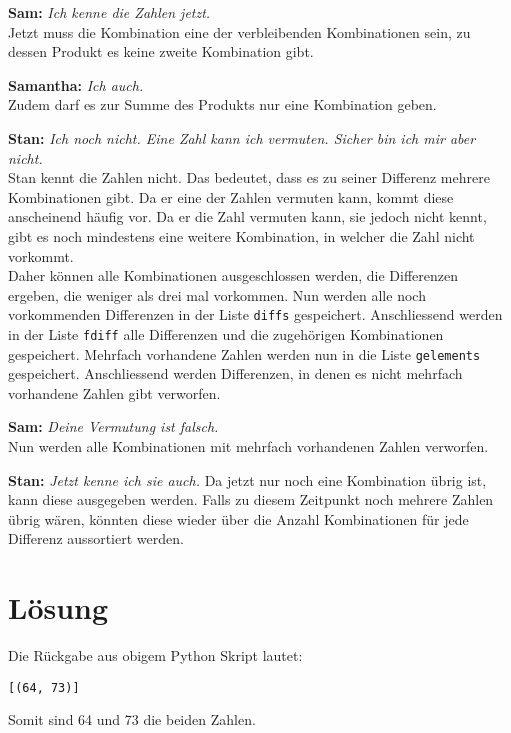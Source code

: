 \documentclass[a4paper, 10pt, fleqn]{article}
\begin{document}
\textbf{Sam: }\emph{Ich kenne die Zahlen jetzt. } \\
Jetzt muss die Kombination eine der verbleibenden Kombinationen sein, zu dessen 
Produkt es keine zweite Kombination gibt. 


\textbf{Samantha: }\emph{Ich auch. } \\
Zudem darf es zur Summe des Produkts nur eine Kombination geben. 


\textbf{Stan: }\emph{Ich noch nicht. Eine Zahl kann ich vermuten. 
Sicher bin ich mir aber nicht.} \\
Stan kennt die Zahlen nicht. Das bedeutet, dass es zu seiner Differenz mehrere 
Kombinationen gibt. Da er eine der Zahlen vermuten kann, kommt diese 
anscheinend häufig vor. Da er die Zahl vermuten kann, sie jedoch nicht kennt, 
gibt es noch mindestens eine weitere Kombination, in welcher die Zahl nicht 
vorkommt. \\
Daher können alle Kombinationen ausgeschlossen werden, die Differenzen ergeben, 
die weniger als drei mal vorkommen. Nun werden alle noch vorkommenden 
Differenzen in der Liste \verb?diffs? gespeichert. Anschliessend werden in der 
Liste \verb?fdiff? alle Differenzen und die zugehörigen Kombinationen 
gespeichert. Mehrfach vorhandene Zahlen werden nun in die Liste 
\verb?gelements? gespeichert. Anschliessend werden Differenzen, in denen es 
nicht mehrfach vorhandene Zahlen gibt verworfen. 


\textbf{Sam: }\emph{Deine Vermutung ist falsch. } \\
Nun werden alle Kombinationen mit mehrfach vorhandenen Zahlen verworfen. 


\textbf{Stan: }\emph{Jetzt kenne ich sie auch. }
Da jetzt nur noch eine Kombination übrig ist, kann diese ausgegeben werden. 
Falls zu diesem Zeitpunkt noch mehrere Zahlen übrig wären, könnten diese wieder 
über die Anzahl Kombinationen für jede Differenz aussortiert werden. 


\section{Lösung}
Die Rückgabe aus obigem Python Skript lautet: 
\begin{lstlisting}
[(64, 73)]
\end{lstlisting}
Somit sind 64 und 73 die beiden Zahlen. 
\end{document}
